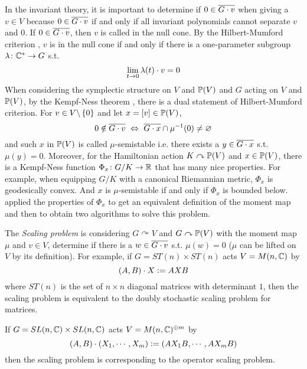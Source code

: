 \documentclass[a4paper,12pt]{article}
\begin{document}
	In the invariant theory, it is important to determine if $0 \in \overline{G\cdot v}$ when giving a $v \in V$ because $0 \in \overline{G\cdot v}$ if and only if all invariant polynomials cannot separate $v$ and $0$. If $0 \in \overline{G\cdot v}$, then $v$ is called in the null cone. By the Hilbert-Mumford criterion \cite{key7}, $v$ is in the null cone if and only if there is a one-parameter subgroup $\lambda \colon \mathbb{C}^{*} \rightarrow G$ s.t. 
	\begin{equation*}
		\lim_{t \rightarrow 0} \lambda(t) \cdot v = 0
	\end{equation*}
	When considering the symplectic structure on $V$ and $\mathbb{P}(V)$ and $G$ acting on $V$ and $\mathbb{P}(V)$, by the Kempf-Ness theorem \cite{key8}, there is a dual statement of Hilbert-Mumford criterion. For $v \in V \backslash \left\{0\right\}$ and let $x = [v] \in \mathbb{P}(V)$,
	\begin{equation*}
		0 \notin \overline{G \cdot v} ~\Leftrightarrow~ \overline{G \cdot x} \cap \mu^{-1}(0) \neq \varnothing
	\end{equation*}
	and such $x$ in $\mathbb{P}(V)$ is called $\mu$-semistable i.e. there exists a $y \in \overline{G \cdot x}$ s.t. $\mu(y) = 0$. Moreover, for the Hamiltonian action $K \curvearrowright \mathbb{P}(V)$ and $x \in \mathbb{P}(V)$, there is a Kempf-Ness function $\Phi_x \colon G/K \rightarrow \mathbb{R}$ that has many nice properties. For example, when equipping $G/K$ with a canonical Riemannian metric, $\Phi_x$ is geodesically convex. And $x$ is $\mu$-semistable if and only if $\Phi_x$ is bounded below. \cite{key9} applied the properties of $\Phi_x$ to get an equivalent definition of the moment map and then to obtain two algorithms to solve this problem.

	The \emph{Scaling problem} is considering $G \curvearrowright V$ and $G \curvearrowright \mathbb{P}(V)$ with the moment map $\mu$ and $v \in V$, determine if there is a $w \in \overline{G\cdot v}$ s.t. $\mu(w) = 0$ ($\mu$ can be lifted on $V$ by its definition). For example, if $G = ST(n) \times ST(n)$ acts $V = M(n,\mathbb{C})$ by
	\begin{equation*}
		(A,B) \cdot X \vcentcolon= AXB
	\end{equation*}
	where $ST(n)$ is the set of $n\times n$ diagonal matrices with determinant $1$, then the scaling problem is equivalent to the doubly stochastic scaling problem for matrices. 

	If $G = SL(n,\mathbb{C}) \times SL(n,\mathbb{C})$ acts $V = M(n,\mathbb{C})^{\oplus m}$ by
	\begin{equation*}
		(A,B) \cdot (X_1,\cdots,X_m) \vcentcolon= (AX_1B,\cdots,AX_mB)
	\end{equation*}
	then the scaling problem is corresponding to the operator scaling problem.
\end{document}
